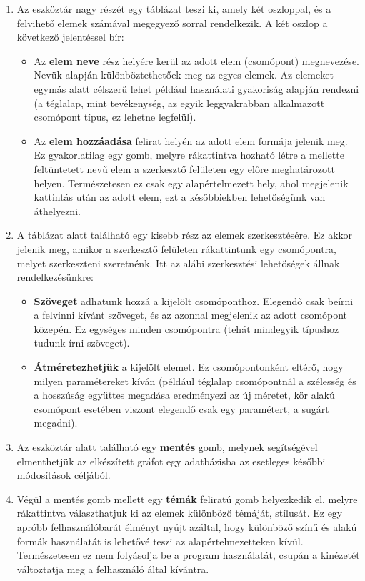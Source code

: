 \begin{enumerate}
\item Az eszköztár nagy részét egy táblázat teszi ki, amely két oszloppal, és a felvihető elemek számával megegyező sorral rendelkezik. A két oszlop a következő jelentéssel bír:

\begin{itemize}
\item Az \textbf{elem neve} rész helyére kerül az adott elem (csomópont) megnevezése. Nevük alapján különböztethetőek meg az egyes elemek. Az elemeket egymás alatt célszerű lehet például használati gyakoriság alapján rendezni (a téglalap, mint tevékenység, az egyik leggyakrabban alkalmazott csomópont típus, ez lehetne legfelül).
\item Az \textbf{elem hozzáadása} felirat helyén az adott elem formája jelenik meg. Ez gyakorlatilag egy gomb, melyre rákattintva hozható létre a mellette feltüntetett nevű elem a szerkesztő felületen egy előre meghatározott helyen. Természetesen ez csak egy alapértelmezett hely, ahol megjelenik kattintás után az adott elem, ezt a későbbiekben lehetőségünk van áthelyezni.
\end{itemize}

\item A táblázat alatt található egy kisebb rész az elemek szerkesztésére. Ez akkor jelenik meg, amikor a szerkesztő felületen rákattintunk egy csomópontra, melyet szerkeszteni szeretnénk. Itt az alábi szerkesztési lehetőségek állnak rendelkezésünkre:

\begin{itemize}
\item \textbf{Szöveget} adhatunk hozzá a kijelölt csomóponthoz. Elegendő csak beírni a felvinni kívánt szöveget, és az azonnal megjelenik az adott csomópont közepén. Ez egységes minden csomópontra (tehát mindegyik típushoz tudunk írni szöveget).
\item \textbf{Átméretezhetjük} a kijelölt elemet. Ez csomópontonként eltérő, hogy milyen paramétereket kíván (például téglalap csomópontnál a szélesség és a hosszúság együttes megadása eredményezi az új méretet, kör alakú csomópont esetében viszont elegendő csak egy paramétert, a sugárt megadni).
\end{itemize}

\item Az eszköztár alatt található egy \textbf{mentés} gomb, melynek segítségével elmenthetjük az elkészített gráfot egy adatbázisba az esetleges későbbi módosítások céljából.

\item Végül a mentés gomb mellett egy \textbf{témák} feliratú gomb helyezkedik el, melyre rákattintva választhatjuk ki az elemek különböző témáját, stílusát. Ez egy apróbb felhasználóbarát élményt nyújt azáltal, hogy különböző színű és alakú formák használatát is lehetővé teszi az alapértelmezetteken kívül. Természetesen ez nem folyásolja be a program használatát, csupán a kinézetét változtatja meg a felhasználó által kívántra.
\end{enumerate}

